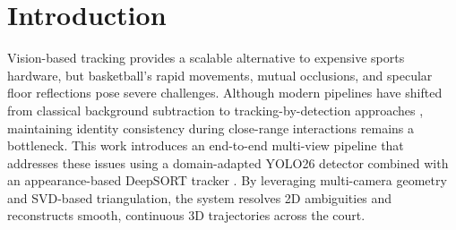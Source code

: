 \section{Introduction}\label{sec:intro}

Vision-based tracking provides a scalable alternative to expensive sports hardware, but basketball's rapid movements, mutual occlusions, and specular floor reflections pose severe challenges.
Although modern pipelines have shifted from classical background subtraction \cite{survey} to tracking-by-detection approaches \cite{sort}, maintaining identity consistency during close-range interactions remains a bottleneck.
This work introduces an end-to-end multi-view pipeline that addresses these issues using a domain-adapted YOLO26 detector \cite{yolo_paper} combined with an appearance-based DeepSORT tracker \cite{deepsort,reid}.
By leveraging multi-camera geometry and SVD-based triangulation, the system resolves 2D ambiguities and reconstructs smooth, continuous 3D trajectories across the court.



